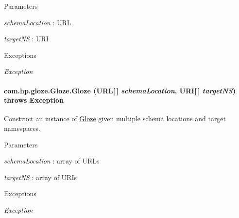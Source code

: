 \begin{DoxyParams}{Parameters}
\item[{\em schemaLocation}]: URL \item[{\em targetNS}]: URI \end{DoxyParams}

\begin{DoxyExceptions}{Exceptions}
\item[{\em Exception}]\end{DoxyExceptions}
\hypertarget{classcom_1_1hp_1_1gloze_1_1_gloze_a89bab13ce337f1d674204631e220898e}{
\paragraph[{Gloze}]{\setlength{\rightskip}{0pt plus 5cm}com.hp.gloze.Gloze.Gloze (URL\mbox{[}$\,$\mbox{]} {\em schemaLocation}, \/  URI\mbox{[}$\,$\mbox{]} {\em targetNS})  throws Exception }\hfill}
\label{classcom_1_1hp_1_1gloze_1_1_gloze_a89bab13ce337f1d674204631e220898e}
Construct an instance of \hyperlink{classcom_1_1hp_1_1gloze_1_1_gloze}{Gloze} given multiple schema locations and target namespaces.


\begin{DoxyParams}{Parameters}
\item[{\em schemaLocation}]: array of URLs \item[{\em targetNS}]: array of URIs \end{DoxyParams}

\begin{DoxyExceptions}{Exceptions}
\item[{\em Exception}]\end{DoxyExceptions}


